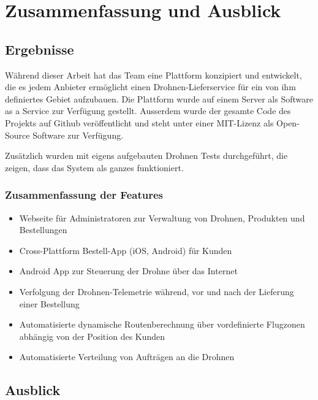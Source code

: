 \chapter{Zusammenfassung und Ausblick}

\section{Ergebnisse}

Während dieser Arbeit hat das Team eine Plattform konzipiert und entwickelt, die es jedem Anbieter ermöglicht einen Drohnen-Lieferservice für ein von ihm definiertes Gebiet aufzubauen. Die Plattform wurde auf einem Server als Software as a Service zur Verfügung gestellt. Ausserdem wurde der gesamte Code des Projekts auf Github veröffentlicht und steht unter einer \Gls{MIT-Lizenz} als Open-Source Software zur Verfügung.

Zusätzlich wurden mit eigens aufgebauten Drohnen Tests durchgeführt, die zeigen, dass das System als ganzes funktioniert.

\subsection{Zusammenfassung der Features}

\begin{itemize}
	\item Webseite für Administratoren zur Verwaltung von Drohnen, Produkten und Bestellungen
	\item Cross-Plattform Bestell-App (iOS, Android) für Kunden
	\item Android App zur Steuerung der Drohne über das Internet
	\item Verfolgung der Drohnen-Telemetrie während, vor und nach der Lieferung einer Bestellung
	\item Automatisierte dynamische Routenberechnung über vordefinierte Flugzonen abhängig von der Position des Kunden
	\item Automatisierte Verteilung von Aufträgen an die Drohnen
\end{itemize}

\section{Ausblick}